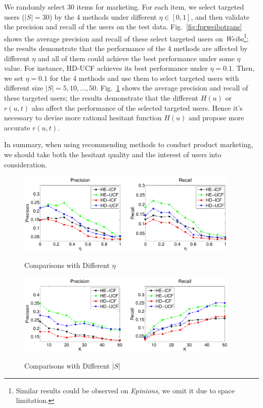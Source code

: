 \documentclass{llncs}
\begin{document}
We randomly select 30 items for marketing. For each item, we select targeted users ($|S|=30$) by the 4 methods under different $\eta \in [0,1]$, and then validate the precision and recall of the users on the test data. 
Fig.~\ref{fig:fprweibotrans} shows the average precision and recall of these select targeted users on \emph{Weibo}\footnote{Similar results could be observed on \emph{Epinions}, we omit it due to space limitation.}; the results demonstrate that the performance of the 4 methods are affected by different $\eta$ and all of them could achieve the best performance under some $\eta$ value. For instance, HD-UCF achieves its best performance under $\eta = 0.1$.
Then, we set $\eta = 0.1$ for the 4 methods and use them to select targeted users with different size $|S|=5,10,...,50$. 
 Fig.~\ref{fig:fprweibo} shows the average precision and recall of these targeted users; the results demonstrate that the different $H(u)$ or $r(u,t)$ also affect the performance of the selected targeted users. Hence it's necessary to devise more rational hesitant function $H(u)$ and propose more accurate $r(u,t)$.

In summary, when using recommending methods to conduct product marketing, we should take both the hesitant quality and the interest of users into consideration.

\begin{figure}[hbt]
\begin{minipage}[t]{0.5\linewidth}
  \centering
  \includegraphics[width=0.95\textwidth]{res/isu_f_pr_weibo_transpose.pdf}\\
  \vspace*{-0.35cm}
  \caption{Comparisons with Different $\eta$}\label{fig:fprweibotrans}
\end{minipage}%
\begin{minipage}[t]{0.5\linewidth}
\centering
\includegraphics[width=0.95\textwidth]{res/isu_f_pr_weibo.pdf}\\
  \vspace*{-0.35cm}
\caption{Comparisons with Different $|S|$ } \label{fig:fprweibo}
\end{minipage}
\end{figure}
\end{document}
